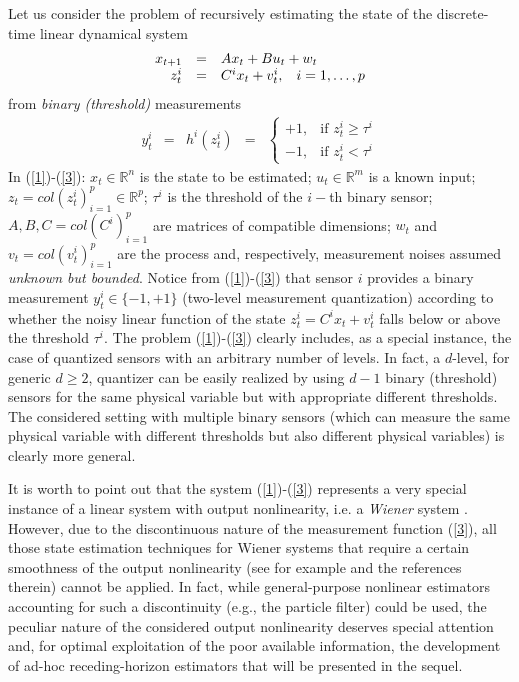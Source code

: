 \documentclass[11pt,journal,onecolumn]{IEEEtran}
\begin{document}
Let us consider the problem of recursively estimating the state of the discrete-time linear dynamical system
\begin{equation}\label{1}
\begin{array}{rcl}
x_{t+1}  & = &  Ax_{t}+Bu_{t}+ w_{t} \\
z_{t}^{i} & = &  C^{i}x_{t}+ v_{t}^{i},\hspace{3mm}i=1,\ldots,p
\end{array}
\end{equation}
from \textit{binary (threshold)} measurements
\begin{equation} \label{3}
\begin{array}{rclcl}
y_{t}^{i} & = & h^i(z_{t}^{i}) & = &  \left\{
\begin{array}{ll} +1, & \mbox{if }  z_{t}^{i} \geq \tau^{i} \\
                         -1,   & \mbox{if }  z_{t}^{i}  < \tau^{i}
\end{array}
\right.
\end{array}
\end{equation}
In (\ref{1})-(\ref{3}): $x_t \in \mathbb{R}^n$ is the state to be estimated; $u_t \in \mathbb{R}^m$ is a known input; $z_t = col \left( z_t^i \right)_{i=1}^p \in \mathbb{R}^p$; $\tau^i$ is the threshold of the $i-$th binary sensor; $A, B, C = col \left( C^i \right)_{i=1}^p$ are matrices of compatible dimensions; $w_t$ and $v_t = col \left( v_t^i \right)_{i=1}^p$ are the process and, respectively, measurement noises assumed \textit{unknown but bounded}. Notice from (\ref{1})-(\ref{3}) that sensor $i$ provides a binary measurement $y_t^i \in \{-1,+1\}$ (two-level measurement quantization) according to whether the noisy linear function of the state $z_t^i = C^i x_t + v_t^i$ falls below or above the threshold $\tau^i$. The problem (\ref{1})-(\ref{3}) clearly includes, as a special instance, the case of quantized sensors with an arbitrary number of levels. In fact, a $d$-level, for generic $d  \geq 2$, quantizer can be easily realized by using $d-1$  binary (threshold) sensors  for the same physical variable but with appropriate different thresholds.
The considered setting with multiple binary sensors (which can measure the same physical variable with different thresholds but also different physical variables) is clearly more general.

It is worth to point out that the system (\ref{1})-(\ref{3}) represents a very special instance of a linear system with output nonlinearity, i.e. a \textit{Wiener} system \cite{Wiener1}. However, due to the discontinuous nature of the measurement function (\ref{3}), all those state estimation techniques for Wiener systems that require a certain smoothness of the output nonlinearity (see for example \cite{Wiener2} and the references therein) cannot be applied. In fact, while general-purpose nonlinear estimators accounting for such a discontinuity (e.g., the particle filter) could be used, the peculiar nature of the considered output nonlinearity deserves special attention and, for optimal exploitation of the poor available information,  the development of ad-hoc receding-horizon estimators that will be presented in the sequel.
\end{document}
